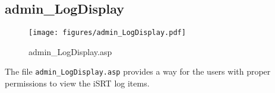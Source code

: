 \subsection{admin\_LogDisplay}
\begin{figure}[htb]
    \begin{center}
        \texttt{[image: figures/admin\_LogDisplay.pdf]}
    \end{center}
    \caption{admin\_LogDisplay.asp}
    \label{fig:admin_LogDisplay}
\end{figure}

The file \verb|admin_LogDisplay.asp| provides a way for the users with proper
permissions to view the iSRT log items.
